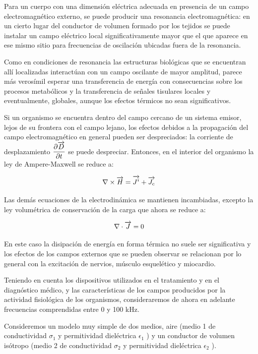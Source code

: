 Para un cuerpo con una dimensión eléctrica adecuada en presencia de un campo electromagnético externo, se puede producir una resonancia electromagnética: en un cierto lugar del conductor de volumen formado por los tejidos se puede instalar un campo eléctrico local significativamente mayor que el que aparece en ese mismo sitio para frecuencias de oscilación ubicadas fuera de la resonancia.

Como en condiciones de resonancia las estructuras biológicas que se encuentran allí localizadas interactúan con un campo oscilante de mayor amplitud, parece más verosímil esperar una transferencia de energía con consecuencias sobre los procesos metabólicos y la transferencia de señales tisulares locales y eventualmente, globales, aunque los efectos térmicos no sean significativos.

Si un organismo se encuentra dentro del campo cercano de un sistema emisor, lejos de su frontera con el campo lejano, los efectos debidos a la propagación del campo electromagnético en general pueden ser despreciados: la corriente de desplazamiento $\dfrac{\partial \overrightarrow{D}}{\partial t}$ se puede despreciar. Entonces, en el interior del organismo la ley de Ampere-Maxwell se reduce a:

\begin{equation}
\label{eq:623}
	\nabla \times \overrightarrow{H} = \overrightarrow{J^{i}}+\overrightarrow{J_{c}}
\end{equation}

Las demás ecuaciones de la electrodinámica se mantienen incambiadas, excepto la ley volumétrica de conservación de la carga que ahora se reduce a:

\begin{equation*}
	\nabla \cdot \overrightarrow{J} = 0
\end{equation*}

En este caso la disipación de energía en forma térmica no suele ser significativa y los efectos de los campos externos que se pueden observar se relacionan por lo general con la excitación de nervios, músculo esquelético y miocardio.

Teniendo en cuenta los dispositivos utilizados en el tratamiento y en el diagnóstico médico, y las características de los campos producidos por la actividad fisiológica de los organismos, consideraremos de ahora en adelante frecuencias comprendidas entre 0 y 100 kHz.

Consideremos un modelo muy simple de dos medios, aire (medio 1 de conductividad $\sigma_{1}$ y permitividad dieléctrica $\epsilon_{1}$ ) y un conductor de volumen isótropo (medio 2 de conductividad $\sigma_{2}$ y permitividad dieléctrica $\epsilon_{2}$ ).

